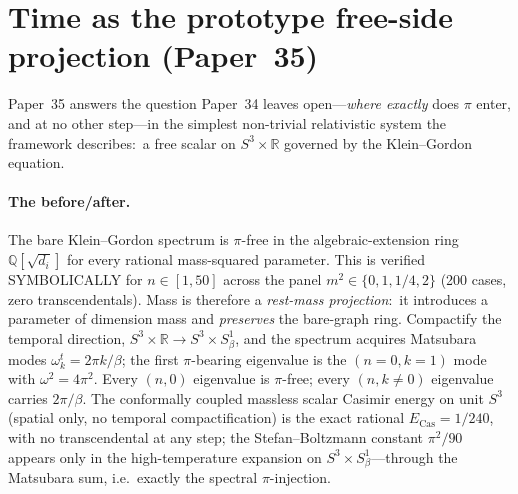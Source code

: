 \documentclass[aps,pra,twocolumn,superscriptaddress,longbibliography,nofootinbib]{revtex4-2}
\begin{document}
\section{Time as the prototype free-side projection (Paper~35)}
\label{sec:time}

Paper~35 answers the question Paper~34 leaves open---\emph{where exactly}
does $\pi$ enter, and at no other step---in the simplest non-trivial
relativistic system the framework describes:\ a free scalar on
$S^3\times\mathbb{R}$ governed by the Klein--Gordon equation.

\paragraph{The before/after.}
The bare Klein--Gordon spectrum is $\pi$-free in the algebraic-extension
ring $\mathbb{Q}[\sqrt{d_i}]$ for every rational mass-squared parameter.
This is verified SYMBOLICALLY for $n\in[1,50]$ across the panel
$m^2\in\{0,1,1/4,2\}$ (200 cases, zero transcendentals).  Mass is
therefore a \emph{rest-mass projection}:\ it introduces a parameter of
dimension mass and \emph{preserves} the bare-graph ring.  Compactify the
temporal direction, $S^3\times\mathbb{R}\to S^3\times S^1_\beta$, and the
spectrum acquires Matsubara modes $\omega^t_k = 2\pi k/\beta$; the first
$\pi$-bearing eigenvalue is the $(n{=}0,k{=}1)$ mode with
$\omega^2=4\pi^2$.  Every $(n,0)$ eigenvalue is $\pi$-free; every
$(n,k\neq0)$ eigenvalue carries $2\pi/\beta$.  The conformally coupled
massless scalar Casimir energy on unit $S^3$ (spatial only, no temporal
compactification) is the exact rational $E_{\mathrm{Cas}}=1/240$, with no
transcendental at any step; the Stefan--Boltzmann constant $\pi^2/90$
appears only in the high-temperature expansion on
$S^3\times S^1_\beta$---through the Matsubara sum, i.e.\ exactly the
spectral $\pi$-injection.
\end{document}
